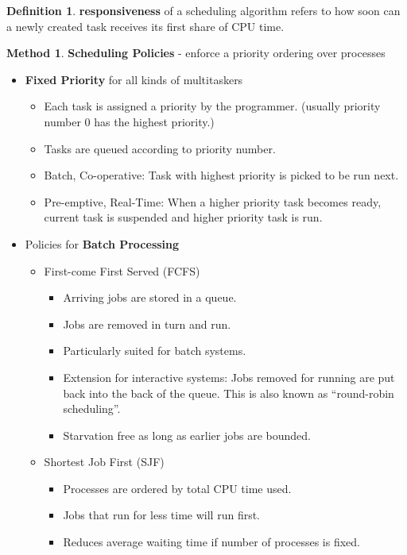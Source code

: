 \documentclass[11pt,a4paper]{article}
\theoremstyle{definition}
\newtheorem{definition}{Definition}[section]
\newtheorem{method}{Method}[section]
\newenvironment{myitemize}
{ \begin{itemize}
    \setlength{\itemsep}{5pt}
    \setlength{\parskip}{0pt}
    \setlength{\parsep}{0pt}     }
{ \end{itemize}                  }
\begin{document}
\begin{definition}{\textbf{responsiveness}}
	of a scheduling algorithm refers to how soon can a newly created task receives its first share of CPU time.
\end{definition}

\begin{method}{\textbf{Scheduling Policies} - enforce a priority ordering over processes}
	\begin{myitemize}
		\item \textbf{Fixed Priority} for all kinds of multitaskers
		\begin{myitemize}
			\item Each task is assigned a priority by the programmer. (usually priority number 0 has the highest priority.)
			\item Tasks are queued according to priority number.
			\item Batch, Co-operative: Task with highest priority is picked to be run next.
			\item Pre-emptive, Real-Time: When a higher priority task becomes ready, current task is suspended and higher priority task is run.
		\end{myitemize}
		\item Policies for \textbf{Batch Processing}
		\begin{myitemize}
			\item First-come First Served (\textsf{FCFS})
			\begin{myitemize}
				\item Arriving jobs are stored in a queue.
				\item Jobs are removed in turn and run.
				\item Particularly suited for batch systems.
				\item Extension for interactive systems: Jobs removed for running are put back into the back of the queue. This is also known as “round-robin scheduling”.
				\item Starvation free as long as earlier jobs are bounded.
			\end{myitemize}
			\item Shortest Job First (\textsf{SJF})
			\begin{myitemize}
				\item Processes are ordered by total CPU time used.
				\item Jobs that run for less time will run first.
				\item Reduces average waiting time if number of processes is fixed.

\end{myitemize}
\end{myitemize}
\end{myitemize}
\end{method}
\end{document}
